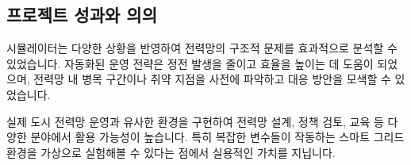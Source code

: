 \subsection{프로젝트 성과와 의의}
시뮬레이터는 다양한 상황을 반영하여 전력망의 구조적 문제를 효과적으로 분석할 수 있었습니다. 자동화된 운영 전략은 정전 발생을 줄이고 효율을 높이는 데 도움이 되었으며, 전력망 내 병목 구간이나 취약 지점을 사전에 파악하고 대응 방안을 모색할 수 있었습니다.

실제 도시 전력망 운영과 유사한 환경을 구현하여 전력망 설계, 정책 검토, 교육 등 다양한 분야에서 활용 가능성이 높습니다. 특히 복잡한 변수들이 작동하는 스마트 그리드 환경을 가상으로 실험해볼 수 있다는 점에서 실용적인 가치를 지닙니다.